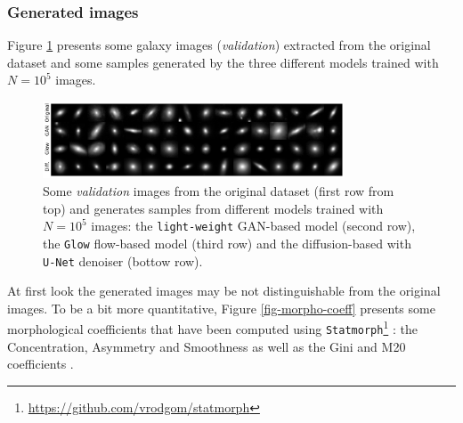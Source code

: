 \documentclass[11pt]{amsart}
\begin{document}
\subsubsection{Generated images}
Figure \ref{fig-Original-Glow-UNet-Gan-samples} presents some galaxy images (\textit{validation}) extracted from the original dataset and some samples generated by  the three different models trained with $N=10^5$ images. 
%
\begin{figure}
    \centering
        \includegraphics[width=0.8\textwidth]{fig-model_sample_images.pdf}
    \caption{Some \textit{validation} images from the original dataset (first row from top) and  generates samples from different models trained with $N=10^5$ images:  the \texttt{light-weight} GAN-based model (second row), the \texttt{Glow} flow-based model (third row) and the diffusion-based with \texttt{U-Net} denoiser (bottow row).}
    \label{fig-Original-Glow-UNet-Gan-samples}
\end{figure}
At first look the generated images may be not distinguishable from the original images.
To be a bit more quantitative, Figure \ref{fig-morpho-coeff} presents  some morphological coefficients that have been computed using \texttt{Statmorph}\footnote{\url{https://github.com/vrodgom/statmorph}} \citep{2019MNRAS.483.4140R}: the Concentration, Asymmetry and Smoothness \citep{2000AJ....119.2645B,2003ApJS..147....1C,2004AJ....128..163L}  as well as the Gini and M20 coefficients \citep{2004AJ....128..163L,10.1093/mnras/stv2078}.
\end{document}
